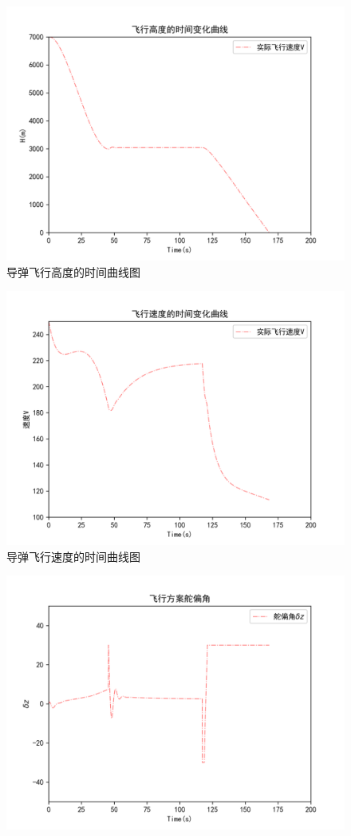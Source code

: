 \documentclass[UTF8]{ctexart}
\begin{document}
\begin{itemize}
\begin{figure}[H]
    \centering
    \includegraphics[width=130mm]{img/飞行高度.png}
    \caption{导弹飞行高度的时间曲线图}
\end{figure}
\begin{figure}[H]
    \centering
    \includegraphics[width=130mm]{img/飞行速度.png}
    \caption{导弹飞行速度的时间曲线图}
\end{figure}
\begin{figure}[H]
    \centering
    \includegraphics[width=130mm]{img/飞行舵偏角.png}

\end{figure}
\end{itemize}
\end{document}
